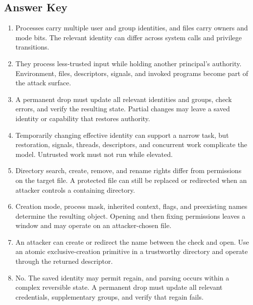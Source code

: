 \documentclass[11pt,letterpaper]{article}
\begin{document}
\subsection*{Answer Key}
\begin{enumerate}
\item Processes carry multiple user and group identities, and files carry owners and mode bits. The relevant identity can differ across system calls and privilege transitions.
\item They process less-trusted input while holding another principal's authority. Environment, files, descriptors, signals, and invoked programs become part of the attack surface.
\item A permanent drop must update all relevant identities and groups, check errors, and verify the resulting state. Partial changes may leave a saved identity or capability that restores authority.
\item Temporarily changing effective identity can support a narrow task, but restoration, signals, threads, descriptors, and concurrent work complicate the model. Untrusted work must not run while elevated.
\item Directory search, create, remove, and rename rights differ from permissions on the target file. A protected file can still be replaced or redirected when an attacker controls a containing directory.
\item Creation mode, process mask, inherited context, flags, and preexisting names determine the resulting object. Opening and then fixing permissions leaves a window and may operate on an attacker-chosen file.
\item An attacker can create or redirect the name between the check and open. Use an atomic exclusive-creation primitive in a trustworthy directory and operate through the returned descriptor.
\item No. The saved identity may permit regain, and parsing occurs within a complex reversible state. A permanent drop must update all relevant credentials, supplementary groups, and verify that regain fails.
\end{enumerate}
\end{document}
